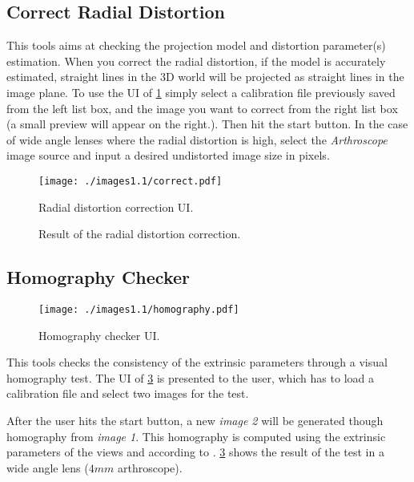 \documentclass[article,11pt]{memoir}
\begin{document}
\subsection{Correct Radial Distortion}
This tools aims at checking the projection model and distortion parameter(s) estimation. When you correct the radial distortion, if the model is accurately estimated, straight lines in the 3D world will be projected as straight lines in the image plane. To use the UI of \figurename  \ref{fig:correctUI} simply select a calibration file previously saved from the left list box, and the image you want to correct from the right list box (a small preview will appear on the right.). Then hit the start button. In the case of wide angle lenses where the radial distortion is high, select the \textit{Arthroscope} image source and input a desired undistorted image size in pixels.
\begin{figure}
\centering
  \texttt{[image: ./images1.1/correct.pdf]}
\caption{Radial distortion correction UI.}
\label{fig:correctUI}
\end{figure}
 
\begin{figure}
\centering
\caption{Result of the radial distortion correction.}
\label{fig:correctUI_result}
\end{figure}


\subsection{Homography Checker}

\begin{figure}
\centering
  \texttt{[image: ./images1.1/homography.pdf]}
\caption{Homography checker UI.}
\label{fig:homoUI}
\end{figure}

This tools checks the consistency of the extrinsic parameters through a visual homography test. The UI of \figurename \ref{fig:homoUI} is presented to the user, which has to load a calibration file and select two images for the test.

After the user hits the start button, a new \textit{image 2} will be generated though homography from \textit{image 1}. This homography is computed using the extrinsic parameters of the views and according to \cite{amarelo}. \figurename \ref{fig:homoUI} shows the result of the test in a wide angle lens ($4mm$ arthroscope).
\end{document}
